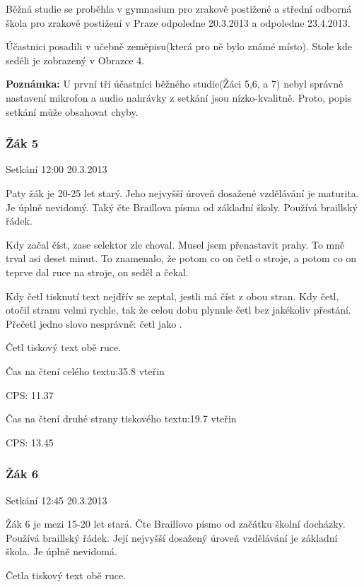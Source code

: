 Běžná studie se proběhla v gymnasium pro zrakově postižené a střední odborná škola pro zrakově postižení v Praze odpoledne 20.3.2013 a odpoledne 23.4.2013.

Účastnici posadili v učebně zeměpisu(která pro ně bylo známé místo).  Stole kde seděli je zobrazený v Obrazce 4.

{\bf Poznámka:}  U první tři účastníci běžného studie(Žáci 5,6, a 7) nebyl správně nastavení mikrofon a audio nahrávky z setkání jsou nízko-kvalitně.  Proto, popis setkání může obsahovat chyby.

\subsubsection{Žák 5}
Setkání 12:00 20.3.2013

Paty žák je 20-25 let starý.  Jeho nejvyšší úroveň dosažené vzdělávání je maturita. Je úplně nevidomý.  Taký čte Braillova písma od základní školy.  Používá braillský řádek.

Kdy začal číst, zase selektor zle choval.  Musel jsem přenastavit prahy.  To mně trval asi deset minut.  To znamenalo, že potom co on četl o stroje, a potom co on teprve dal ruce na stroje, on seděl a čekal.

Kdy četl tisknutí text nejdřív se zeptal, jestli má číst z obou stran.  Kdy četl, otočil stranu velmi rychle, tak že celou dobu plynule četl bez jakékoliv přestání.  Přečetl jedno slovo nesprávně: četl  jako .

Četl tiskový text obě ruce.


Čas na čtení celého textu:35.8 vteřin

CPS: 11.37

Čas na čtení druhé strany tiskového textu:19.7 vteřin

CPS: 13.45

\subsubsection{Žák 6}
Setkání 12:45 20.3.2013

Žák 6 je mezi 15-20 let stará. Čte Braillovo písmo od začátku školní docházky. Používá braillský řádek. Její nejvyšší dosažený úroveň vzdělávání je základní škola.  Je úplně nevidomá.

Četla tiskový text obě ruce.



